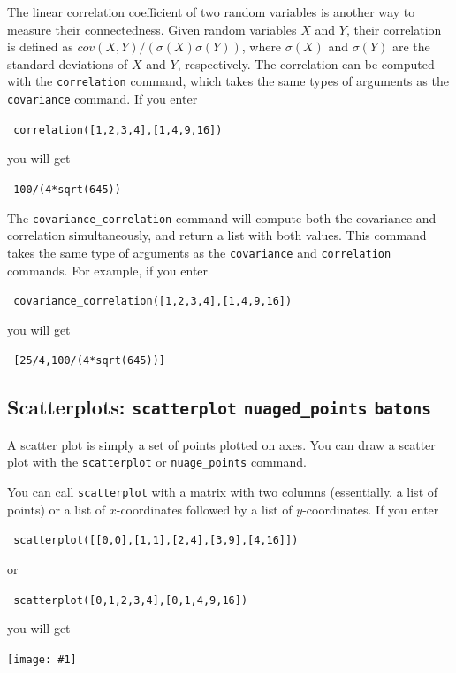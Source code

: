 \documentclass[a4paper,11pt]{book}
\newcommand{\includeimage}[1]
{\texttt{[image: \#1]}}
\begin{document}
The linear correlation coefficient of two random variables is another
way to measure their connectedness.  Given random variables $X$ and
$Y$, their correlation is defined as
$cov(X,Y)/(\sigma(X)\sigma(Y))$, where $\sigma(X)$ and $\sigma(Y)$ are
the standard deviations of $X$ and $Y$, respectively.  The correlation
can be computed with the \texttt{correlation} command, which takes the
same types of arguments as the \texttt{covariance} command.  If you
enter
\begin{center}
  \tt
  correlation([1,2,3,4],[1,4,9,16])
\end{center}
you will get
\begin{center}
  \tt
  100/(4*sqrt(645))
\end{center}

The \texttt{covariance\_correlation} command will compute both the
covariance and correlation simultaneously, and return a list with both
values.  This command takes the same type of arguments as the
\texttt{covariance} and \texttt{correlation} commands.  For example,
if you enter
\begin{center}
  \tt
  covariance\_correlation([1,2,3,4],[1,4,9,16])
\end{center}
you will get
\begin{center}
  \tt
  [25/4,100/(4*sqrt(645))]
\end{center}

\subsection{Scatterplots: \texttt{scatterplot}
\texttt{nuaged\_points} \texttt{batons}}

A scatter plot is simply a set of points plotted on axes.  You can
draw a scatter plot with the \texttt{scatterplot} or
\texttt{nuage\_points} command.

You can call \texttt{scatterplot} with a matrix with two columns
(essentially, a list of points) or a list of
$x$-coordinates followed by a list of $y$-coordinates.  If you enter
\begin{center}
  \tt
  scatterplot([[0,0],[1,1],[2,4],[3,9],[4,16]])
\end{center}
or
\begin{center}
  \tt
  scatterplot([0,1,2,3,4],[0,1,4,9,16])
\end{center}
you will get
\begin{center}
  \includeimage{xcas-scatterplot.png}
\end{center}
\end{document}
